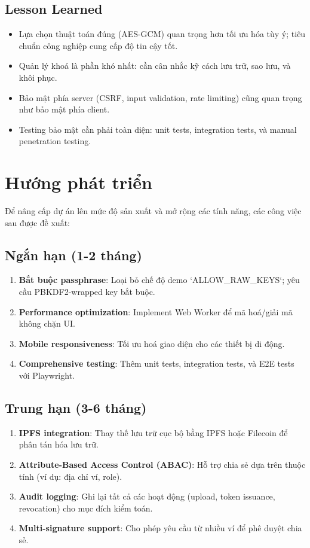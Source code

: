 \subsection*{Lesson Learned}
\begin{itemize}
  \item Lựa chọn thuật toán đúng (AES-GCM) quan trọng hơn tối ưu hóa tùy ý; tiêu chuẩn công nghiệp cung cấp độ tin cậy tốt.
  \item Quản lý khoá là phần khó nhất: cần cân nhắc kỹ cách lưu trữ, sao lưu, và khôi phục.
  \item Bảo mật phía server (CSRF, input validation, rate limiting) cũng quan trọng như bảo mật phía client.
  \item Testing bảo mật cần phải toàn diện: unit tests, integration tests, và manual penetration testing.
\end{itemize}

\section{Hướng phát triển}
Để nâng cấp dự án lên mức độ sản xuất và mở rộng các tính năng, các công việc sau được đề xuất:

\subsection*{Ngắn hạn (1-2 tháng)}
\begin{enumerate}
  \item \textbf{Bắt buộc passphrase}: Loại bỏ chế độ demo `ALLOW_RAW_KEYS`; yêu cầu PBKDF2-wrapped key bắt buộc.
  \item \textbf{Performance optimization}: Implement Web Worker để mã hoá/giải mã không chặn UI.
  \item \textbf{Mobile responsiveness}: Tối ưu hoá giao diện cho các thiết bị di động.
  \item \textbf{Comprehensive testing}: Thêm unit tests, integration tests, và E2E tests với Playwright.
\end{enumerate}

\subsection*{Trung hạn (3-6 tháng)}
\begin{enumerate}
  \item \textbf{IPFS integration}: Thay thế lưu trữ cục bộ bằng IPFS hoặc Filecoin để phân tán hóa lưu trữ.
  \item \textbf{Attribute-Based Access Control (ABAC)}: Hỗ trợ chia sẻ dựa trên thuộc tính (ví dụ: địa chỉ ví, role).
  \item \textbf{Audit logging}: Ghi lại tất cả các hoạt động (upload, token issuance, revocation) cho mục đích kiểm toán.
  \item \textbf{Multi-signature support}: Cho phép yêu cầu từ nhiều ví để phê duyệt chia sẻ.
\end{enumerate}

